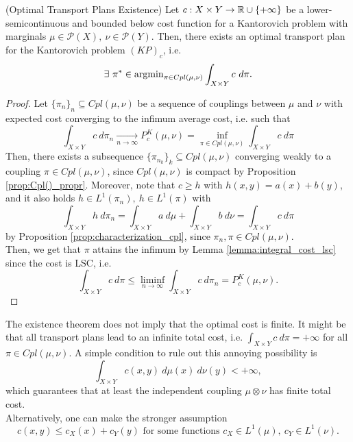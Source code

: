 \documentclass[../main.tex]{subfiles}
\begin{document}
\begin{theorem}
\label{thm:optimal_plan_existence}
    (Optimal Transport Plans Existence) Let $c: X\times Y\to \mathbb{R}\cup\{+\infty\}$ be a lower-semicontinuous and bounded below cost function for a Kantorovich problem with marginals $\mu\in\mathcal{P}(X), \ \nu\in\mathcal{P}(Y)$. Then, there exists an optimal transport plan for the Kantorovich problem $(KP)_c$, i.e.
    $$
    \exists \ \pi^*\in\text{argmin}_{\pi\in Cpl(\mu, \nu)} \int_{X\times Y} c \ d\pi.
    $$
\end{theorem}
\begin{proof}
    Let $\{\pi_n\}_n\subseteq Cpl(\mu, \nu)$ be a sequence of couplings between $\mu$ and $\nu$ with expected cost converging to the infimum average cost, i.e. such that
    $$
    \int_{X\times Y} c \ d\pi_n \underset{n\to\infty}{\longrightarrow} P^K_c(\mu, \nu) = \inf_{\pi\in Cpl(\mu, \nu)} \int_{X\times Y} c \ d\pi 
    $$
    Then, there exists a subsequence $\{\pi_{n_k}\}_k \subseteq Cpl(\mu, \nu)$ converging weakly to a coupling $\pi\in Cpl(\mu, \nu)$, since $Cpl(\mu, \nu)$ is compact by Proposition \ref{prop:Cpl()_propr}. Moreover, note that $c\geq h$ with $h(x, y) = a(x) + b(y)$, and it also holds $h\in L^1(\pi_n), \ h\in L^1(\pi)$ with
    $$
    \int_{X\times Y} h \ d\pi_n 
    = \int_{X\times Y} a\ d\mu + \int_{X\times Y} b\ d\nu 
    = \int_{X\times Y} c\ d\pi 
    $$
    by Proposition \ref{prop:characterization_cpl}, since $\pi_n, \pi\in Cpl(\mu, \nu)$. \\
    Then, we get that $\pi$ attains the infimum by Lemma \ref{lemma:integral_cost_lsc} since the cost is LSC, i.e.
    $$
    \int_{X\times Y} c \ d\pi \leq \liminf_{n\to\infty} \int_{X\times Y} c \ d\pi_n = P^K_c(\mu, \nu).
    $$
\end{proof}

\begin{remark}
    The existence theorem does not imply that the optimal cost is finite. It might be that all transport plans lead to an infinite total cost, i.e. $\int_{X\times Y} c \ d\pi = +\infty$ for all $\pi\in Cpl(\mu, \nu)$. A simple condition to rule out this annoying possibility is
    $$
    \int_{X\times Y} c(x, y) \ d\mu(x) \ d\nu(y) < +\infty,
    $$ 
    which guarantees that at least the independent coupling $\mu\otimes\nu$ has finite total cost. \\
    Alternatively, one can make the stronger assumption
    $$
    c(x, y) \leq c_X(x) + c_Y(y) \text{ for some functions } c_X\in L^1(\mu), \ c_Y\in L^1(\nu). 
    $$
\end{remark}
\end{document}
